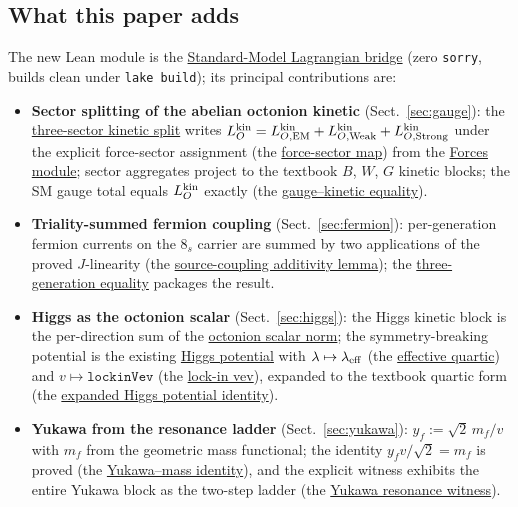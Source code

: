 \documentclass[11pt]{amsart}
\begin{document}
\subsection{What this paper adds}
\label{subsec:adds}

The new Lean module is the
\hyperref[lean:sm-lagrangian-module]{Standard-Model Lagrangian bridge}
(zero \texttt{sorry}, builds clean under \texttt{lake build}); its principal
contributions are:

\begin{itemize}[leftmargin=2em]
\item \textbf{Sector splitting of the abelian octonion kinetic}
  (Sect.~\ref{sec:gauge}): the
  \hyperref[lean:LO-kinetic-split]{three-sector kinetic split} writes
  $L_O^{\rm kin}=L_{O,{\rm EM}}^{\rm kin}+L_{O,{\rm Weak}}^{\rm kin}+L_{O,{\rm Strong}}^{\rm kin}$
  under the explicit force-sector assignment (the
  \hyperref[lean:O-to-sector]{force-sector map}) from the
  \hyperref[lean:forces]{Forces module}; sector aggregates project to
  the textbook $B$, $W$, $G$ kinetic blocks; the SM gauge total equals
  $L_O^{\rm kin}$ exactly (the
  \hyperref[lean:gauge-eq-kin]{gauge--kinetic equality}).
\item \textbf{Triality-summed fermion coupling} (Sect.~\ref{sec:fermion}):
  per-generation fermion currents on the $8_s$ carrier are summed by two
  applications of the proved $J$-linearity (the
  \hyperref[lean:J-add]{source-coupling additivity lemma}); the
  \hyperref[lean:three-gen]{three-generation equality} packages the result.
\item \textbf{Higgs as the octonion scalar} (Sect.~\ref{sec:higgs}):
  the Higgs kinetic block is the per-direction sum of the
  \hyperref[lean:scalar-norm]{octonion scalar norm}; the
  symmetry-breaking potential is the existing
  \hyperref[lean:higgs-pot]{Higgs potential} with
  $\lambda\mapsto\lambda_{\rm eff}$ (the
  \hyperref[lean:lambda-eff]{effective quartic}) and
  $v\mapsto\texttt{lockinVev}$ (the
  \hyperref[lean:lockin-vev]{lock-in vev}), expanded to the textbook
  quartic form (the
  \hyperref[lean:higgs-expanded]{expanded Higgs potential identity}).
\item \textbf{Yukawa from the resonance ladder} (Sect.~\ref{sec:yukawa}):
  $y_f := \sqrt{2}\,m_f/v$ with $m_f$ from the geometric mass functional;
  the identity $y_f v / \sqrt{2}=m_f$ is proved (the
  \hyperref[lean:yukawa-mass]{Yukawa--mass identity}), and the explicit
  witness exhibits the entire Yukawa block as the two-step ladder (the
  \hyperref[lean:yukawa-resonance]{Yukawa resonance witness}).

\end{itemize}
\end{document}
